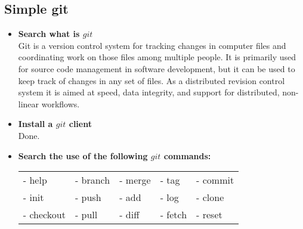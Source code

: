 \documentclass{article}
\begin{document}
\begin{spacing}{2}
\section{Simple git}
\begin{itemize}
    \item \textbf{Search what is $git$}\\
    Git is a version control system for tracking changes in computer files and coordinating work on those files among multiple people. It is primarily used for source code management in software development, but it can be used to keep track of changes in any set of files. As a distributed revision control system it is aimed at speed, data integrity, and support for distributed, non-linear workflows.\\
    \item \textbf{Install a $git$ client}\\
    Done.\\
    \item \textbf{Search the use of the following $git$ commands:}
    \begin{center}
    \begin{table}[!h]
    \begin{tabular}{lllll}
    - help&- branch&- merge&- tag&- commit\\
    - init&- push&- add&- log&- clone\\
    - checkout&- pull&- diff&- fetch&- reset\\
    \end{tabular}
    \end{table}
    \end{center}


\end{itemize}
\end{spacing}
\end{document}
